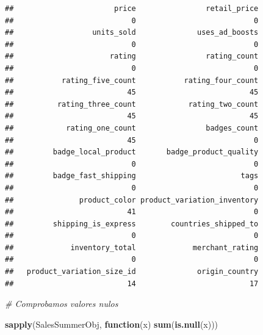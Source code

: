 \documentclass[
]{article}
\newenvironment{Shaded}{\begin{snugshade}}{\end{snugshade}}
\newcommand{\CommentTok}[1]{\textcolor[rgb]{0.56,0.35,0.01}{\textit{#1}}}
\newcommand{\ControlFlowTok}[1]{\textcolor[rgb]{0.13,0.29,0.53}{\textbf{#1}}}
\newcommand{\KeywordTok}[1]{\textcolor[rgb]{0.13,0.29,0.53}{\textbf{#1}}}
\newcommand{\NormalTok}[1]{#1}
\begin{document}
\begin{verbatim}
##                       price                retail_price 
##                           0                           0 
##                  units_sold              uses_ad_boosts 
##                           0                           0 
##                      rating                rating_count 
##                           0                           0 
##           rating_five_count           rating_four_count 
##                          45                          45 
##          rating_three_count            rating_two_count 
##                          45                          45 
##            rating_one_count                badges_count 
##                          45                           0 
##         badge_local_product       badge_product_quality 
##                           0                           0 
##         badge_fast_shipping                        tags 
##                           0                           0 
##               product_color product_variation_inventory 
##                          41                           0 
##         shipping_is_express        countries_shipped_to 
##                           0                           0 
##             inventory_total             merchant_rating 
##                           0                           0 
##   product_variation_size_id              origin_country 
##                          14                          17
\end{verbatim}

\begin{Shaded}
\begin{Highlighting}[]
\CommentTok{# Comprobamos valores nulos}

\KeywordTok{sapply}\NormalTok{(SalesSummerObj, }\ControlFlowTok{function}\NormalTok{(x) }\KeywordTok{sum}\NormalTok{(}\KeywordTok{is.null}\NormalTok{(x)))}
\end{Highlighting}
\end{Shaded}
\end{document}
